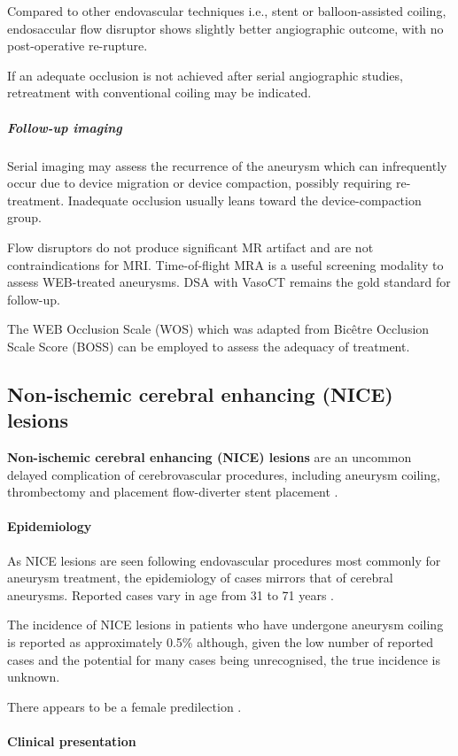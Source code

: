 Compared to other endovascular techniques i.e., stent or balloon-assisted coiling, endosaccular flow disruptor shows slightly better angiographic outcome, with no post-operative re-rupture.

If an adequate occlusion is not achieved after serial angiographic studies, retreatment with conventional coiling may be indicated.

\subparagraph{Follow-up imaging}

Serial imaging may assess the recurrence of the aneurysm which can infrequently occur due to device migration or device compaction, possibly requiring re-treatment. Inadequate occlusion usually leans toward the device-compaction group.

Flow disruptors do not produce significant MR artifact and are not contraindications for MRI. Time-of-flight MRA is a useful screening modality to assess WEB-treated aneurysms. DSA with VasoCT remains the gold standard for follow-up.

The WEB Occlusion Scale (WOS) which was adapted from Bicêtre Occlusion Scale Score (BOSS) can be employed to assess the adequacy of treatment.
\subsection{Non-ischemic cerebral enhancing (NICE) lesions}

\textbf{Non-ischemic cerebral enhancing (NICE) lesions} are an uncommon delayed complication of cerebrovascular procedures, including aneurysm coiling, thrombectomy and placement flow-diverter stent placement .

\paragraph{Epidemiology}

As NICE lesions are seen following endovascular procedures most commonly for aneurysm treatment, the epidemiology of cases mirrors that of cerebral aneurysms. Reported cases vary in age from 31 to 71 years .

The incidence of NICE lesions in patients who have undergone aneurysm coiling is reported as approximately 0.5\%  although, given the low number of reported cases and the potential for many cases being unrecognised, the true incidence is unknown.

There appears to be a female predilection .

\paragraph{Clinical presentation}

